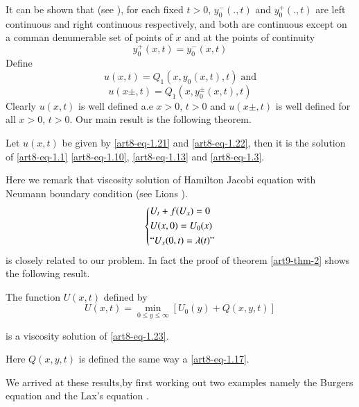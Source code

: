 It can be shown  that (see \cite{art8-key5}), for each fixed $t> 0$, $y_{0}^{-}(.,t)$ and $y_{0}^{+}(.,t)$ are left continuous and right continuous respectively, and both are continuous except on a comman denumerable set of points of $x$ and at the points of continuity
$$
y_{0}^{+}(x, t)= y_{0}^{-}(x,t)
$$ 
Define
\begin{equation}\label{art8-eq-1.21}
u(x,t)=Q_{1}(x, y_{0}(x,t),t)\; \text{and}
\end{equation}
\begin{equation}\label{art8-eq-1.22}
u(x \pm, t) =Q_{1}(x,y_{0}^{\pm}(x,t),t)
\end{equation}
Clearly $u(x,t)$ is well defined a.e $x>0$, $t>0$ and $u(x\pm, t)$ is well defined for all $x>0$, $t>0$. Our main result is the following theorem.

\begin{theorem}\label{art8-thm-2}
Let $u(x,t)$ be given by \eqref{art8-eq-1.21} and \eqref{art8-eq-1.22}, then it is the solution of \eqref{art8-eq-1.1}
\eqref{art8-eq-1.10}, \eqref{art8-eq-1.13} and \eqref{art8-eq-1.3}. 
\end{theorem}
 Here we remark that viscosity solution of Hamilton Jacobi equation with Neumann boundary condition (see Lions \cite{art8-key11, art8-key12}).
 \begin{equation}\label{art8-eq-1.23}
 \left\{
\begin{aligned}
&U_{t}+ f(U_{x})=0\\
&U(x, 0) =U_{0}(x)\\
&``U_{x}(0,t)= \lambda(t)"
\end{aligned}
\right.
 \end{equation}
is closely related to our problem. In fact the proof of theorem \ref{art9-thm-2} shows the following result.

\begin{theorem}\label{art8-thm-3}
The function $U(x, t)$ defined by
\begin{equation}\label{art8-eq-1.24}
U(x,t)= \min\limits_{0 \leq y \leq \infty}[U_{0}(y) + Q(x, y,t)]
\end{equation}
\end{theorem}
 is a viscosity solution of \eqref{art8-eq-1.23}.

Here $Q(x,y,t)$ is defined the same way a \eqref{art8-eq-1.17}.

We arrived at these results,by first working out two examples namely the Burgers equation \cite{art8-key3} and the Lax's equation \cite{art8-key4}.

